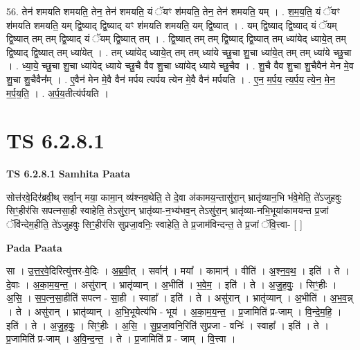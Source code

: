 \documentclass[17pt]{extarticle}
\begin{document}
56. तेन॑ शमयति शमयति॒ तेन॒ तेन॑ शमयति॒ यं ॅयꣳ श॑मयति॒ तेन॒ तेन॑ शमयति॒ यम् । . श॒म॒य॒ति॒ यं ॅयꣳ श॑मयति शमयति॒ यम् द्वि॒ष्याद् द्वि॒ष्याद् यꣳ श॑मयति शमयति॒ यम् द्वि॒ष्यात् । . यम् द्वि॒ष्याद् द्वि॒ष्याद् यं ॅयम् द्वि॒ष्यात् तम् तम् द्वि॒ष्याद् यं ॅयम् द्वि॒ष्यात् तम् । . द्वि॒ष्यात् तम् तम् द्वि॒ष्याद् द्वि॒ष्यात् तम् ध्या॑येद् ध्याये॒त् तम् द्वि॒ष्याद् द्वि॒ष्यात् तम् ध्या॑येत् । . तम् ध्या॑येद् ध्याये॒त् तम् तम् ध्या॑ये च्छु॒चा शु॒चा ध्या॑ये॒त् तम् तम् ध्या॑ये च्छु॒चा । . ध्या॒ये॒ च्छु॒चा शु॒चा ध्या॑येद् ध्याये च्छु॒चै वैव शु॒चा ध्या॑येद् ध्याये च्छु॒चैव । . शु॒चै वैव शु॒चा शु॒चैवैन॑ मेन मे॒व शु॒चा शु॒चैवैन᳚म् । . ए॒वैन॑ मेन मे॒वै वैन॑ मर्पय त्यर्पय त्येन मे॒वै वैन॑ मर्पयति । . ए॒न॒ म॒र्प॒य॒ त्य॒र्प॒य॒ त्ये॒न॒ मे॒न॒ म॒र्प॒य॒ति॒ । . अ॒र्प॒य॒तीत्य॑र्पयति । \newline
\pagebreak
{}

\section{ TS 6.2.8.1 }

\textbf{TS 6.2.8.1 } \newline
\textbf{Samhita Paata} \newline

सोत्त॑रवे॒दिर॑ब्रवी॒थ् सर्वा॒न् मया॒ कामा॒न् व्य॑श्नव॒थेति॒ ते दे॒वा अ॑कामय॒न्तासु॑रा॒न् भ्रातृ॑व्यान॒भि भ॑वे॒मेति॒ ते॑ऽजुहवुः सिꣳ॒॒हीर॑सि सपत्नसा॒ही स्वाहेति॒ तेऽसु॑रा॒न् भ्रातृ॑व्या-न॒भ्य॑भव॒न् तेऽसु॑रा॒न् भ्रातृ॑व्या-नभि॒भूया॑कामयन्त प्र॒जां ॅवि॑न्देम॒हीति॒ ते॑ऽजुहवुः सिꣳ॒॒हीर॑सि सुप्रजा॒वनिः॒ स्वाहेति॒ ते प्र॒जाम॑विन्दन्त॒ ते प्र॒जां ॅवि॒त्त्वा- [  ] \newline

\textbf{Pada Paata} \newline

सा । उ॒त्त॒र॒वे॒दिरित्यु॑त्तर-वे॒दिः । अ॒ब्र॒वी॒त् । सर्वान्॑ । मया᳚ । कामान्॑ । वीति॑ । अ॒श्न॒व॒थ॒ । इति॑ । ते । दे॒वाः । अ॒का॒म॒य॒न्त॒ । असु॑रान् । भ्रातृ॑व्यान् । अ॒भीति॑ । भ॒वे॒म॒ । इति॑ । ते । अ॒जु॒ह॒वुः॒ । सिꣳ॒॒हीः । अ॒सि॒ । स॒प॒त्न॒सा॒हीति॑ सपत्न - सा॒ही । स्वाहा᳚ । इति॑ । ते । असु॑रान् । भ्रातृ॑व्यान् । अ॒भीति॑ । अ॒भ॒व॒न्न् । ते । असु॑रान् । भ्रातृ॑व्यान् । अ॒भि॒भूयेत्य॑भि - भूय॑ । अ॒का॒म॒य॒न्त॒ । प्र॒जामिति॑ प्र-जाम् । वि॒न्दे॒म॒हि॒ । इति॑ । ते । अ॒जु॒ह॒वुः॒ । सिꣳ॒॒हीः । अ॒सि॒ । सु॒प्र॒जा॒वनि॒रिति॑ सुप्रजा - वनिः॑ । स्वाहा᳚ । इति॑ । ते । प्र॒जामिति॑ प्र-जाम् । अ॒वि॒न्द॒न्त॒ । ते । प्र॒जामिति॑ प्र - जाम् । वि॒त्त्वा ।  \newline
\end{document}
